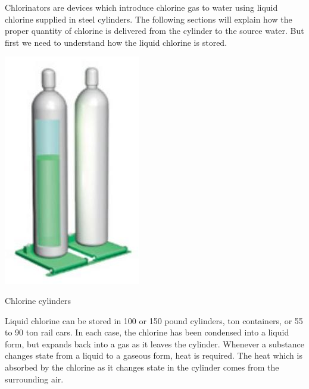 \documentclass[10pt]{article}
\begin{document}
Chlorinators are devices which introduce chlorine gas to water using liquid chlorine supplied in steel cylinders. The following sections will explain how the proper quantity of chlorine is delivered from the cylinder to the source water. But first we need to understand how the liquid chlorine is stored.

\includegraphics[max width=\textwidth]{2022_10_14_eba0aec33b37be0fbdf2g-14}

Chlorine cylinders

Liquid chlorine can be stored in 100 or 150 pound cylinders, ton containers, or 55 to 90 ton rail cars. In each case, the chlorine has been condensed into a liquid form, but expands back into a gas as it leaves the cylinder. Whenever a substance changes state from a liquid to a gaseous form, heat is required. The heat which is absorbed by the chlorine as it changes state in the cylinder comes from the surrounding air.
\end{document}
